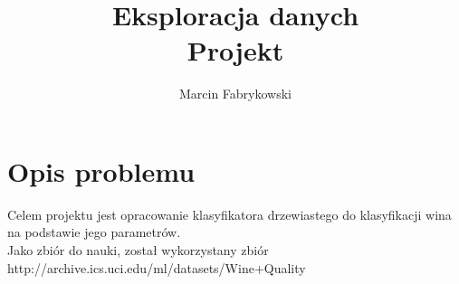 \documentclass[a4paper,12pt]{article}
\author{Marcin Fabrykowski}
\title{Eksploracja danych\\Projekt}
\begin{document}
\maketitle
\newpage
\tableofcontents
\newpage
\section{Opis problemu}
Celem projektu jest opracowanie klasyfikatora drzewiastego do klasyfikacji wina na podstawie jego parametrów.\\
Jako zbiór do nauki, został wykorzystany zbiór\\
http://archive.ics.uci.edu/ml/datasets/Wine+Quality
\end{document}

